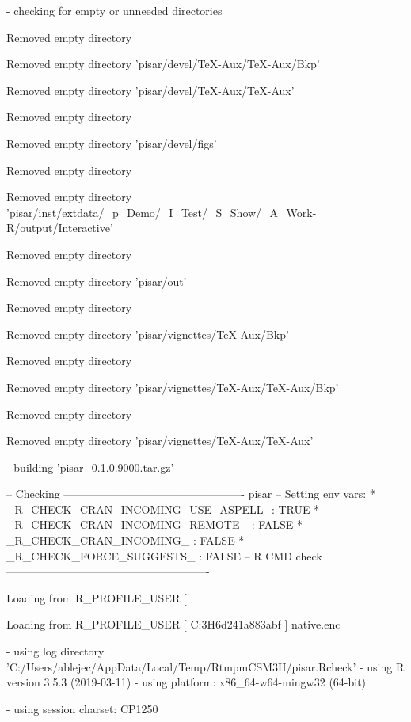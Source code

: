 \documentclass[a4paper,12pt]{article}\usepackage[]{graphicx}\usepackage[]{color}
\begin{document}
\begin{Schunk}
\begin{Soutput}
  
  
  
-  checking for empty or unneeded directories

  
Removed empty directory 
  
   Removed empty directory 'pisar/devel/TeX-Aux/TeX-Aux/Bkp'

  
   Removed empty directory 'pisar/devel/TeX-Aux/TeX-Aux'

  
Removed empty directory 
  
   Removed empty directory 'pisar/devel/figs'

  
Removed empty directory 
  
   Removed empty directory 'pisar/inst/extdata/_p_Demo/_I_Test/_S_Show/_A_Work-R/output/Interactive'

  
Removed empty directory 
  
   Removed empty directory 'pisar/out'

  
Removed empty directory 
  
   Removed empty directory 'pisar/vignettes/TeX-Aux/Bkp'

  
Removed empty directory 
  
   Removed empty directory 'pisar/vignettes/TeX-Aux/TeX-Aux/Bkp'

  
Removed empty directory 
  
   Removed empty directory 'pisar/vignettes/TeX-Aux/TeX-Aux'

  
  
  
-  building 'pisar_0.1.0.9000.tar.gz'

  
   

-- Checking ------------------------------------------------- pisar --
Setting env vars:
* _R_CHECK_CRAN_INCOMING_USE_ASPELL_: TRUE
* _R_CHECK_CRAN_INCOMING_REMOTE_    : FALSE
* _R_CHECK_CRAN_INCOMING_           : FALSE
* _R_CHECK_FORCE_SUGGESTS_          : FALSE
-- R CMD check -------------------------------------------------------
  
Loading from R_PROFILE_USER [
  
   Loading from R_PROFILE_USER [ C:\Users\ablejec\AppData\Local\Temp\RtmpmCSM3H\file6d241a883abf ]
   native.enc 

  
  
  
-  using log directory 'C:/Users/ablejec/AppData/Local/Temp/RtmpmCSM3H/pisar.Rcheck'
-  using R version 3.5.3 (2019-03-11)
-  using platform: x86_64-w64-mingw32 (64-bit)

  
-  using session charset: CP1250

  
  

\end{Soutput}
\end{Schunk}
\end{document}
